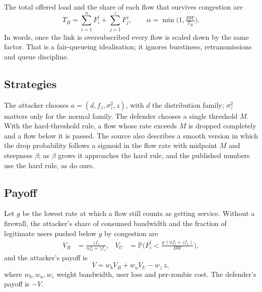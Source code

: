 \documentclass[conference]{IEEEtran}
\renewcommand{\Pr}{\mathbb{P}}
\begin{document}
The total offered load and the share of each flow that survives congestion are
\begin{equation}
T_B=\sum_{i=1}^{n}F^l_i+\sum_{j=1}^{z}F^z_j,\qquad
\alpha=\min\!\Big(1,\tfrac{BW}{T_B}\Big).
\label{eq:alpha}
\end{equation}
In words, once the link is oversubscribed every flow is scaled down by the same factor. That is a fair-queueing idealisation; it ignores burstiness, retransmissions and queue discipline.

\subsection{Strategies}
The attacker chooses $a=(d,f_z,\sigma_z^2,z)$, with $d$ the distribution family; $\sigma_z^2$ matters only for the normal family. The defender chooses a single threshold $M$. With the hard-threshold rule, a flow whose rate exceeds $M$ is dropped completely and a flow below it is passed. The source also describes a smooth version in which the drop probability follows a sigmoid in the flow rate with midpoint $M$ and steepness $\beta$; as $\beta$ grows it approaches the hard rule, and the published numbers use the hard rule, as do ours.

\subsection{Payoff}
Let $g$ be the lowest rate at which a flow still counts as getting service. Without a firewall, the attacker's share of consumed bandwidth and the fraction of legitimate users pushed below $g$ by congestion are
\begin{align}
V_B &= \frac{z f_z}{n f_l + z f_z}, &
V_U &= \Pr\!\Big(F^l_i<\tfrac{g\,(n f_l + z f_z)}{BW}\Big),
\end{align}
and the attacker's payoff is
\begin{equation}
V=w_b V_B+w_u V_U-w_z\,z,
\label{eq:V}
\end{equation}
where $w_b,w_u,w_z$ weight bandwidth, user loss and per-zombie cost. The defender's payoff is $-V$.
\end{document}
